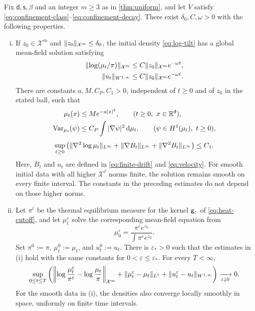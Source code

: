 \documentclass[11pt,reqno]{amsart}
\numberwithin{equation}{section}
\theoremstyle{plain}
\theoremstyle{remark}
\DeclarePairedDelimiter{\norm}{\lVert}{\rVert}
\renewcommand{\d}{\mathsf{d}}\newcommand{\s}{\mathsf{s}}
\newcommand{\Xspace}{\mathcal X}
\begin{document}
\begin{prop}\label{prop:background-stability}
Fix $\d,\s,\beta$ and an integer $m\ge3$ as in \cref{thm:uniform}, and let $V$ satisfy \eqref{eq:confinement-class}--\eqref{eq:confinement-decay}. There exist $\delta_0,C,\omega>0$ with the following properties.
\begin{enumerate}[(i)]
\item If $z_0\in\Xspace^m$ and $\norm{z_0}_{\Xspace^m}\le\delta_0$, the initial density \eqref{eq:log-tilt} has a global mean-field solution satisfying
\begin{align}
 \norm{\log(\mu_t/\pi)}_{\Xspace^m}
    &\le C\norm{z_0}_{\Xspace^m}e^{-\omega t},\label{eq:log-decay}\\
 \norm{u_t}_{W^{1,\infty}}
    &\le C\norm{z_0}_{\Xspace^m}e^{-\omega t}.\label{eq:background-velocity-decay}
\end{align}
There are constants $a,M,C_P,C_1>0$, independent of $t\ge0$ and of $z_0$ in the stated ball, such that
\begin{align}
 \mu_t(x)&\le Me^{-a|x|^2},\qquad(t\ge0,\ x\in\R^\d),\label{eq:background-Gaussian-bound}\\
 \operatorname{Var}_{\mu_t}(\psi)&\le C_P\int|\nabla\psi|^2\dd\mu_t,
       \qquad(\psi\in H^1(\mu_t),\ t\ge0),\label{eq:background-Poincare-bound}
\end{align}
\begin{equation}\label{eq:background-derivative-bound}
 \sup_{t\ge0}\left(\norm{\nabla^2\log\mu_t}_{L^\infty}
       +\norm{\nabla B_t}_{L^\infty}+\norm{\nabla^2B_t}_{L^\infty}\right)\le C_1.
\end{equation}
Here, $B_t$ and $u_t$ are defined in \eqref{eq:finite-drift} and \eqref{eq:velocity}. For smooth initial data with all higher $\Xspace^\ell$ norms finite, the solution remains smooth on every finite interval. The constants in the preceding estimates do not depend on those higher norms.

\item Let $\pi^\varepsilon$ be the thermal equilibrium measure for the kernel $\mathsf g_\varepsilon$ of \eqref{eq:heat-cutoff}, and let $\mu_t^\varepsilon$ solve the corresponding mean-field equation from
\begin{equation}\label{eq:cutoff-background-preparation}
 \mu_0^\varepsilon=\frac{\pi^\varepsilon e^{z_0}}{\int\pi^\varepsilon e^{z_0}}.
\end{equation}
Set $\pi^0:=\pi$, $\mu_t^0:=\mu_t$, and $u_t^0:=u_t$. There is $\varepsilon_*>0$ such that the estimates in (i) hold with the same constants for $0<\varepsilon\le\varepsilon_*$. For every $T<\infty$,
\begin{equation}\label{eq:background-cutoff-convergence}
 \sup_{0\le t\le T}\left(
 \left\|\log\frac{\mu_t^\varepsilon}{\pi^\varepsilon}
             -\log\frac{\mu_t}{\pi}\right\|_{\Xspace^m}
 +\norm{\mu_t^\varepsilon-\mu_t}_{L^1}
 +\norm{u_t^\varepsilon-u_t}_{W^{1,\infty}}\right)\xrightarrow[\varepsilon\downarrow0]{}0.
\end{equation}
For the smooth data in (i), the densities also converge locally smoothly in space, uniformly on finite time intervals.


\end{enumerate}
\end{prop}
\end{document}
